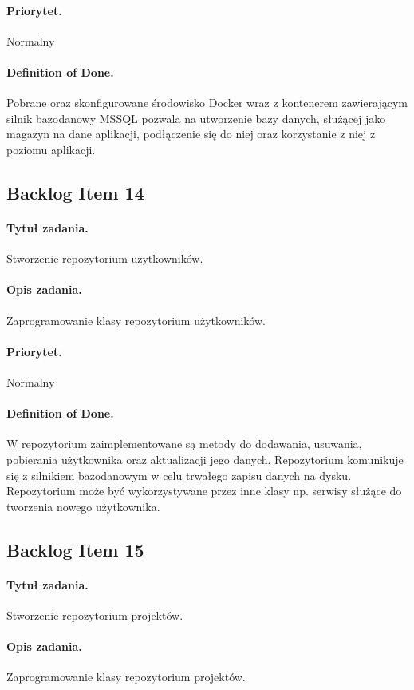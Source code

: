 ﻿\documentclass[a4paper]{article}
\begin{document}
\paragraph{Priorytet.} Normalny
\paragraph{Definition of Done.} Pobrane oraz skonfigurowane środowisko Docker wraz z kontenerem zawierającym silnik bazodanowy MSSQL pozwala na utworzenie bazy danych, służącej jako magazyn na dane aplikacji, podłączenie się do niej oraz korzystanie z niej z poziomu aplikacji.

\subsection{Backlog Item 14} 
\paragraph{Tytuł zadania.} Stworzenie repozytorium użytkowników.
\paragraph{Opis zadania.} Zaprogramowanie klasy repozytorium użytkowników.
\paragraph{Priorytet.} Normalny
\paragraph{Definition of Done.} W repozytorium zaimplementowane są metody do dodawania, usuwania, pobierania użytkownika oraz aktualizacji jego danych. Repozytorium komunikuje się z silnikiem bazodanowym w celu trwałego zapisu danych na dysku. Repozytorium może być wykorzystywane przez inne klasy np. serwisy służące do tworzenia nowego użytkownika.

\subsection{Backlog Item 15} 
\paragraph{Tytuł zadania.} Stworzenie repozytorium projektów.
\paragraph{Opis zadania.} Zaprogramowanie klasy repozytorium projektów.
\end{document}
